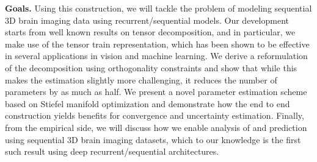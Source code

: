 
\textbf{Goals.} Using this construction, we will tackle the problem of modeling 
sequential 3D brain imaging data using 
recurrent/sequential models. 
Our development starts from well known results on tensor decomposition, and in particular, we
make use of the tensor train representation, which has been shown to be effective in several 
applications in vision and machine learning. We derive a reformulation of the decomposition using 
orthogonality constraints and show that while this makes the estimation slightly more challenging, 
it reduces the number of parameters by as much as half. 
We present a novel parameter estimation scheme based on Stiefel manifold optimization and demonstrate 
how the end to end construction yields benefits for convergence and uncertainty estimation. 
Finally, from the empirical side, we will discuss how we enable analysis of and prediction using sequential 3D brain imaging datasets, which to our knowledge is the first such result using 
deep recurrent/sequential architectures. 
